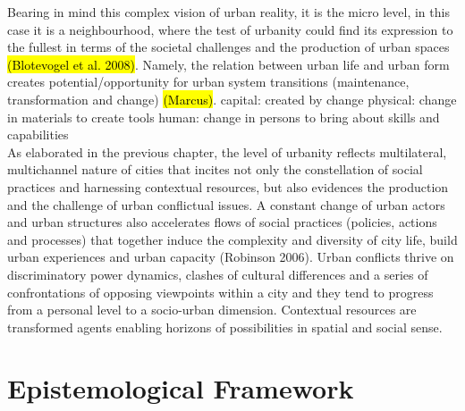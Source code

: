 \documentclass[11pt]{report}
\begin{document}
Bearing in mind this complex vision of urban reality, it is the micro level, in this case it is a neighbourhood, where the test of urbanity could find its expression to the fullest in terms of the societal challenges and the production of urban spaces \hl{(Blotevogel et al. 2008)}.
Namely, the relation between urban life and urban form creates potential/opportunity for urban system transitions (maintenance, transformation and change) \hl{(Marcus)}.
\cite{Coleman 1988}
capital: created by change
    physical: change in materials to create tools
    human: change in persons to bring about skills and capabilities
\\ 
As elaborated in the previous chapter, the level of urbanity reflects multilateral, multichannel  nature of cities that incites not only the constellation of social practices and harnessing contextual resources, but also evidences the production and the challenge of urban conflictual issues. A constant change of urban actors and urban structures also accelerates flows of social practices (policies, actions and processes) that together induce the complexity and diversity of city life, build urban experiences and urban capacity (Robinson 2006). Urban conflicts thrive on discriminatory power dynamics, clashes of cultural differences and a series of confrontations of opposing viewpoints within a city and they tend to progress from a personal level to a socio-urban dimension. Contextual resources are transformed agents enabling horizons of possibilities in spatial and social sense.

\section{Epistemological Framework}
\end{document}
